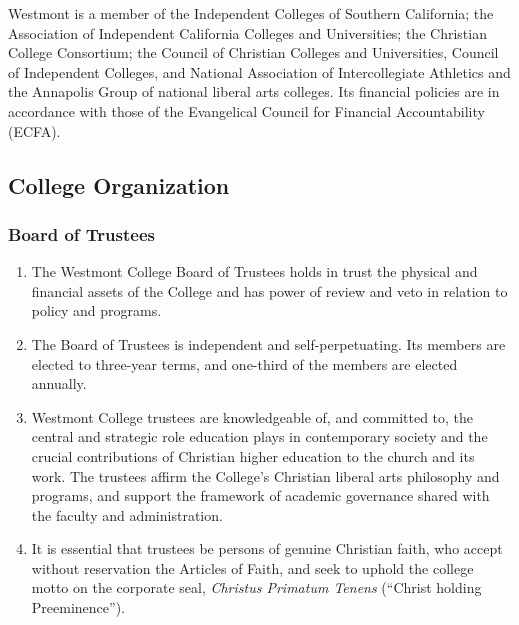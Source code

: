 			Westmont is a member of the Independent Colleges of Southern California; the Association of Independent
			California Colleges and Universities; the Christian College Consortium; the Council of Christian Colleges
			and Universities, Council of Independent Colleges, and National Association of Intercollegiate Athletics and
			the Annapolis Group of national liberal arts colleges.  Its financial policies are in accordance with those
			of the Evangelical Council for Financial Accountability (ECFA).

	\subsection{College Organization}
		\label{sec:CollegeOrganization}
		\subsubsection{Board of Trustees}
			\begin{enumerate}
				\item{
					The Westmont College Board of Trustees holds in trust the physical and financial assets of the College and has power of review and veto in relation to policy and
					programs.
				}
				\item{
					The Board of Trustees is independent and self-perpetuating. Its members are
					elected to three-year terms, and one-third of the members are elected annually.
				}
				\item{
					Westmont College trustees are knowledgeable of, and committed to, the central and strategic role education plays in contemporary society and the crucial contributions of Christian higher education to the church and its work.  The trustees affirm the College's Christian liberal arts philosophy and programs, and support the framework of academic governance shared with the faculty and administration.
				}
				\item{

					It is essential that trustees be persons of genuine Christian faith, who accept without reservation
					the Articles of Faith, and seek to uphold the college motto on the corporate seal, \emph{Christus Primatum
						Tenens} (``Christ holding Preeminence'').
				}

			\end{enumerate}
